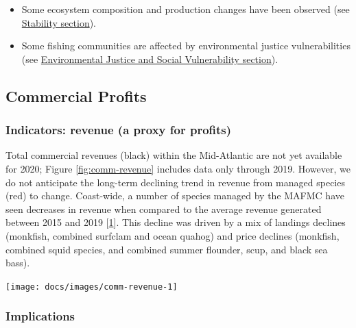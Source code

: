 \documentclass[
  10pt,
]{article}
\providecommand{\tightlist}{%
  \setlength{\itemsep}{0pt}\setlength{\parskip}{0pt}}
\let\origfigure\figure
\let\endorigfigure\endfigure
\renewenvironment{figure}[1][2] {
    \expandafter\origfigure\expandafter[H]
} {
    \endorigfigure
}
\begin{document}
\begin{itemize}
\tightlist
\item
  Some ecosystem composition and production changes have been observed
  (see \protect\hyperlink{stability}{Stability section}).
\item
  Some fishing communities are affected by environmental justice
  vulnerabilities (see
  \protect\hyperlink{social-vulnerability}{Environmental Justice and
  Social Vulnerability section}).
\end{itemize}

\hypertarget{commercial-profits}{%
\subsection{Commercial Profits}\label{commercial-profits}}

\hypertarget{indicators-revenue-a-proxy-for-profits}{%
\subsubsection{Indicators: revenue (a proxy for
profits)}\label{indicators-revenue-a-proxy-for-profits}}

Total commercial revenues (black) within the Mid-Atlantic are not yet
available for 2020; Figure \ref{fig:comm-revenue} includes data only
through 2019. However, we do not anticipate the long-term declining
trend in revenue from managed species (red) to change. Coast-wide, a
number of species managed by the MAFMC have seen decreases in revenue
when compared to the average revenue generated between 2015 and 2019
{[}\protect\hyperlink{ref-thunberg_northeast_2021}{1}{]}. This decline
was driven by a mix of landings declines (monkfish, combined surfclam
and ocean quahog) and price declines (monkfish, combined squid species,
and combined summer flounder, scup, and black sea bass).

\begin{figure}

{\centering \texttt{[image: docs/images/comm-revenue-1]} 

}

\caption{Revenue through 2019 for the for the Mid-Atlantic region: total (black) and from MAFMC managed species (red).}\label{fig:comm-revenue}
\end{figure}

\hypertarget{implications-1}{%
\subsubsection{Implications}\label{implications-1}}
\end{document}
